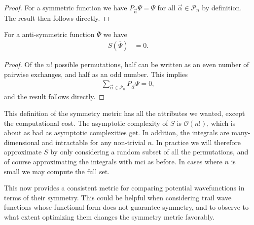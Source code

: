 \documentclass[Thesis.tex]{subfiles}
\begin{document}
\begin{proof}
    For a symmetric function we have $P_{\vec\alpha}\Psi=\Psi$ for all
    $\vec\alpha\in\mathcal{P}_n$ by definition. The result then follows directly.\end{proof}
\begin{corollary}
    For a anti-symmetric function $\overline\Psi$ we have
    \begin{align}
        S(\overline\Psi)&=0.
    \end{align}
\end{corollary}
\begin{proof}
   Of the $n!$ possible permutations, half can be written as an even number of
    pairwise exchanges, and half as an odd number. This implies
    \begin{align}
        \sum_{\vec\alpha\in \mathcal{P}_n} P_{\vec\alpha}\Psi = 0,
    \end{align}
    and the result follows directly.
\end{proof}

This definition of the symmetry metric has all the attributes we wanted, except
the computational cost. The asymptotic complexity of $S$ is $\mathcal{O}(n!)$,
which is about as bad as asymptotic complexities get. In addition, the integrals
are many-dimensional and intractable for any non-trivial $n$. In practice we
will therefore approximate $S$ by only considering a random subset of all the
permutations, and of course approximating the integrals with \gls{mci} as
before. In cases where $n$ is small we may compute the full set.

This now provides a consistent metric for comparing potential wavefunctions in
terms of their symmetry. This could be helpful when considering trail
wave functions whose functional form does not guarantee symmetry, and to observe
to what extent optimizing them changes the symmetry metric favorably.
\end{document}
